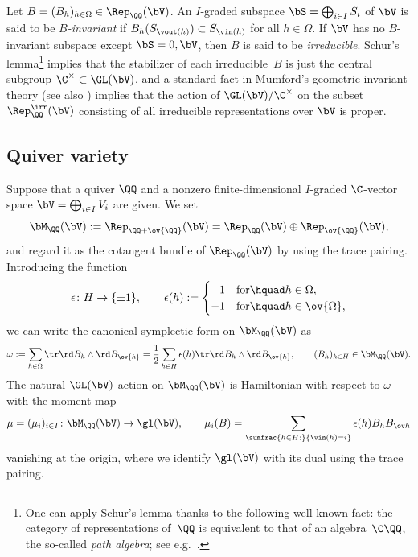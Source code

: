 Let $B=(B_h)_{h \in \Omega} \in \Rep_\QQ(\bV)$.
An $I$-graded subspace $\bS=\bigoplus_{i \in I}S_i$ of $\bV$ is said to be
{\em $B$-invariant} if
$B_h(S_{\vout(h)}) \subset S_{\vin(h)}$ for all $h \in \Omega$.
If $\bV$ has no $B$-invariant subspace except $\bS=0, \bV$,
then $B$ is said to be {\em irreducible}.
Schur's lemma\footnote{One can apply Schur's lemma
thanks to the following well-known fact:
the category of representations of~$\QQ$
is equivalent to that of an algebra~$\C \QQ$,
the so-called {\em path algebra}; see e.g.~\cite{Etingof}.}
implies that the stabilizer of each irreducible~$B$
is just the central subgroup $\C^\times \subset \GL(\bV)$,
and a standard fact in
Mumford's geometric invariant theory
\cite[Corollary~2.5]{MR1304906} (see also \cite{MR1315461})
implies that the action of $\GL(\bV)/\C^\times$ on the subset
$\Rep_\QQ^\irr(\bV)$ consisting of all irreducible representations
over $\bV$ is proper.

\subsection{Quiver variety}\label{subsec:q-variety}

Suppose that a quiver $\QQ$
and a nonzero f\/inite-dimensional $I$-graded $\C$-vector space
$\bV = \bigoplus_{i \in I}V_i$ are given.
We set
\[
\bM_\QQ(\bV) := \Rep_{\QQ+\ov{\QQ}}(\bV)
= \Rep_\QQ(\bV) \oplus \Rep_{\ov{\QQ}}(\bV),
\]
and regard it as the cotangent bundle of $\Rep_\QQ(\bV)$
by using the trace pairing.
Introducing the function
\[
\epsilon \colon H \to \{ \pm 1 \}, \qquad \epsilon(h):=
\begin{cases}
\hphantom{-}1 & \text{for}\hquad h \in \Omega,\\
-1& \text{for}\hquad h \in \ov{\Omega},
\end{cases}
\]
we can write the canonical symplectic form on $\bM_\QQ(\bV)$ as
\[
\omega := \sum_{h \in \Omega} \tr \rd B_h \wedge \rd B_{\ov{h}}
= \frac12 \sum_{h \in H} \epsilon(h) \tr \rd B_h \wedge \rd B_{\ov{h}},
\qquad (B_h)_{h \in H} \in \bM_\QQ(\bV).
\]
The natural $\GL(\bV)$-action on $\bM_\QQ(\bV)$ is Hamiltonian
with respect to $\omega$ with the moment map
\begin{gather}\label{eq:moment}
\mu=(\mu_i)_{i \in I} \colon \bM_\QQ(\bV) \to \gl(\bV), \qquad
\mu_i(B)=\sum_{\sumfrac{h \in H:}{\vin(h)=i}} \epsilon (h) B_h B_{\ov h}
\end{gather}
vanishing at the origin,
where we identify $\gl(\bV)$
with its dual using the trace pairing.

